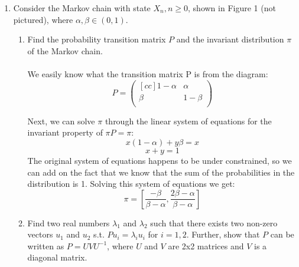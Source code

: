 \begin{enumerate}
  \item Consider the Markov chain with state $X_n, n \geq 0$, shown in Figure 1 (not pictured), where $\alpha, \beta \in (0,1)$.
    \begin{enumerate}
      \item Find the probability transition matrix $P$ and the invariant distribution $\pi$ of the Markov chain.\\\\

        We easily know what the transition matrix P is from the diagram:
        $$
        P = 
        \begin{pmatrix}[cc]
          1-\alpha & \alpha\\
          \beta    & 1-\beta\\
        \end{pmatrix}        
        $$

        Next, we can solve $\pi$ through the linear system of equations for the invariant property of $\pi P = \pi$:
        $$x(1-\alpha) + y \beta = x$$
        $$x + y = 1$$
        The original system of equations happens to be under constrained, so we can add on the fact that we know that the sum of the probabilities in the distribution is 1. Solving this system of equations we get:
        $$\pi = [\frac{-\beta}{\beta - \alpha}, \frac{2 \beta - \alpha}{\beta - \alpha}]$$

      \item Find two real numbers $\lambda_1$ and $\lambda_2$ such that there exists two non-zero vectors $u_1$ and $u_2$ s.t. $Pu_i = \lambda_iu_i$ for $i = 1,2$. Further, show that $P$ can be written as $P = UVU^{-1}$, where $U$ and $V$ are 2x2 matrices and $V$ is a diagonal matrix.\\\\


\end{enumerate}
\end{enumerate}
